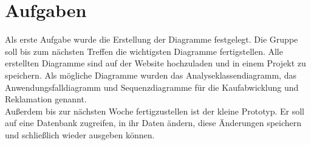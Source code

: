\documentclass{scrartcl}
\begin{document}
\vspace*{1em}

\section{Aufgaben}
Als erste Aufgabe wurde die Erstellung der Diagramme festgelegt. Die Gruppe soll bis zum nächsten Treffen die wichtigsten Diagramme fertigstellen. Alle erstellten Diagramme sind auf der Website hochzuladen und in einem Projekt zu speichern. Als mögliche Diagramme wurden das Analyseklassendiagramm, das Anwendungsfalldiagramm und Sequenzdiagramme für die Kaufabwicklung und Reklamation genannt.\\
Außerdem bis zur nächsten Woche fertigzustellen ist der kleine Prototyp. Er soll auf eine Datenbank zugreifen, in ihr Daten ändern, diese Änderungen speichern und schließlich wieder ausgeben können.
\end{document}
